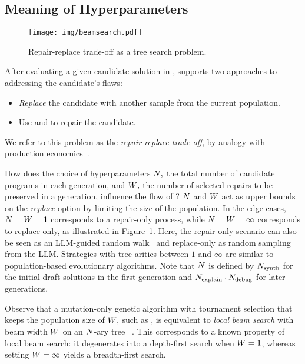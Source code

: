 \subsection{Meaning of Hyperparameters}
\label{sec:seidr-beam-search}

\begin{figure}[t]
    \centering
    \texttt{[image: img/beamsearch.pdf]}
    \caption{Repair-replace trade-off as a tree search problem.}
    \label{fig:beam-search}
\end{figure}

After evaluating a given candidate solution in \execute{}, \method{} supports two approaches to addressing the candidate's flaws:
\begin{itemize}
\setlength{\parskip}{0pt}
\setlength\itemsep{0pt}
  \item \emph{Replace} the candidate with another sample from the current population.
  \item Use \instruct{} and \debug{} to repair the candidate.
\end{itemize}
We refer to this problem as the \emph{repair-replace trade-off}, by analogy with production economics~\cite{jack2000:optimal}. 

How does the choice of hyperparameters $N{},$ the total number of candidate programs in each generation, and $W{},$ the number of selected repairs to be preserved in a generation, influence the flow of \method{}?
$N$ and $W{}$ act as upper bounds on the \emph{replace} option by limiting the size of the population.
In the edge cases, $N{} = W{} = 1$ corresponds to a repair-only process, while $N{} = W{} = \infty$ corresponds to replace-only, as illustrated in Figure~\ref{fig:beam-search}. 
Here, the repair-only scenario can also be seen as an LLM-guided random walk~\cite{xia2020:random} and replace-only as random sampling from the LLM.
Strategies with tree arities between $1$ and $\infty$ are  similar to population-based evolutionary algorithms.
Note that $N{}$ is defined by $N_\text{synth}{}$ for the initial draft solutions in the first generation and $N_\text{explain}{} \cdot N_\text{debug}{}$ for later generations. 

Observe that a mutation-only genetic algorithm with tournament selection that keeps the population size of $W{},$ such as \method{}, is equivalent to \emph{local beam search} with beam width $W{}$ on an $N{}$-ary tree ~\cite[Section 4.1.4]{russell2010:artificial}. This corresponds to a known property of local beam search: it degenerates into a depth-first search when $W{} = 1$, whereas setting $W{} = \infty$ yields a breadth-first search.

